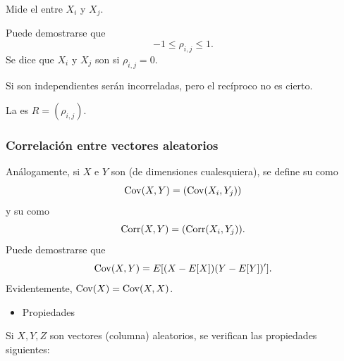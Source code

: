 Mide el  entre $X_i$ y $X_j$.

Puede demostrarse que \[ -1\le\rho_{i,j}\le1. \]
Se dice que $X_i$ y $X_j$ son  si $\rho_{i,j}=0$.

Si son independientes serán incorreladas, pero el recíproco no es cierto.

La  es $R=(\rho_{i,j})$.
\subsubsection{Correlación entre vectores aleatorios}
Análogamente, si $X$ e $Y$ son \veas (de dimensiones cualesquiera), se define su  como \[ \operatorname{Cov}(X,Y)=(\operatorname{Cov}(X_i,Y_j)) \] y su  como \[ \operatorname{Corr}(X,Y)=(\operatorname{Corr}(X_i,Y_j)). \]Puede demostrarse que \[ \operatorname{Cov}(X,Y)=E[(X-E[X])(Y-E[Y])']. \]Evidentemente, $\operatorname{Cov}(X)=\operatorname{Cov}(X,X)$.
\begin{itemize}[label=\color{red}\textbullet, leftmargin=*]
	\item \color{lightblue}Propiedades
\end{itemize}
Si $X,Y,Z$ son vectores (columna) aleatorios, se verifican las propiedades siguientes:
